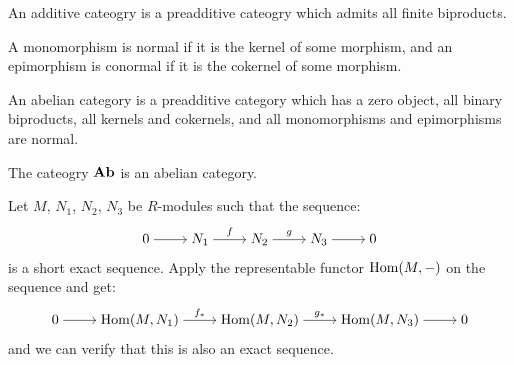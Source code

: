 \documentclass[11pt,a4paper]{article}
\begin{document}
\begin{definition}
  An additive cateogry is a preadditive cateogry which admits all finite
  biproducts.
\end{definition}

\begin{definition}
  A monomorphism is normal if it is the kernel of some morphism,
  and an epimorphism is conormal if it is the cokernel of some morphism.
\end{definition}

\begin{definition}
  An abelian category is a preadditive category
  which has a zero object, all binary biproducts,
  all kernels and cokernels,
  and all monomorphisms and epimorphisms are normal.
\end{definition}

\begin{example}
  The cateogry $\mathbf{Ab}$ is an abelian category.
\end{example}

\begin{example}
  Let $M$, $N_1$, $N_2$, $N_3$ be $R$-modules
  such that the sequence:
  \[\begin{tikzcd}[ampersand replacement=\&,cramped]
    0 \& {N_1} \& {N_2} \& {N_3} \& 0
    \arrow[from=1-1, to=1-2]
    \arrow["f", from=1-2, to=1-3]
    \arrow["g", from=1-3, to=1-4]
    \arrow[from=1-4, to=1-5]
  \end{tikzcd}\]
  is a short exact sequence.
  Apply the representable functor $\operatorname{Hom}(M,-)$
  on the sequence and get:
  \[\begin{tikzcd}[ampersand replacement=\&,cramped]
    0 \& {\Hom(M,N_1)} \& {\Hom(M,N_2)} \& {\Hom(M,N_3)} \& 0
    \arrow[from=1-1, to=1-2]
    \arrow["{f_*}", from=1-2, to=1-3]
    \arrow["{g_*}", from=1-3, to=1-4]
    \arrow[from=1-4, to=1-5]
  \end{tikzcd}\]
  and we can verify that this is also an exact sequence.
\end{example}
\end{document}
